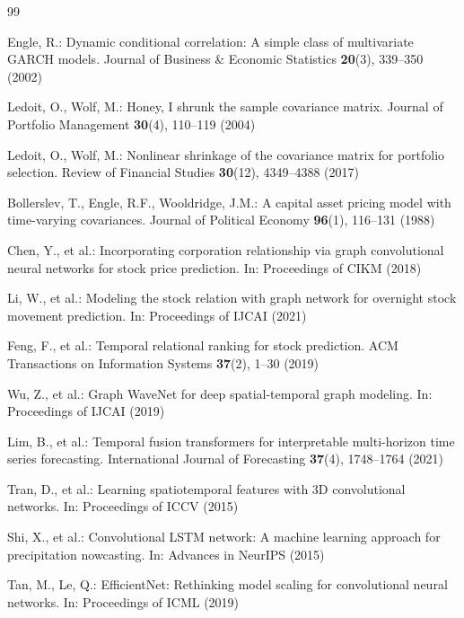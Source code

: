 \documentclass[runningheads]{llncs}
\begin{document}
\begin{thebibliography}{99}

Engle, R.: Dynamic conditional correlation: A simple class of multivariate
GARCH models. Journal of Business \& Economic Statistics \textbf{20}(3),
339--350 (2002)

Ledoit, O., Wolf, M.: Honey, I shrunk the sample covariance matrix.
Journal of Portfolio Management \textbf{30}(4), 110--119 (2004)

Ledoit, O., Wolf, M.: Nonlinear shrinkage of the covariance matrix for
portfolio selection. Review of Financial Studies \textbf{30}(12),
4349--4388 (2017)

Bollerslev, T., Engle, R.F., Wooldridge, J.M.: A capital asset pricing
model with time-varying covariances. Journal of Political Economy
\textbf{96}(1), 116--131 (1988)

Chen, Y., et al.: Incorporating corporation relationship via graph
convolutional neural networks for stock price prediction. In: Proceedings
of CIKM (2018)

Li, W., et al.: Modeling the stock relation with graph network for
overnight stock movement prediction. In: Proceedings of IJCAI (2021)

Feng, F., et al.: Temporal relational ranking for stock prediction.
ACM Transactions on Information Systems \textbf{37}(2), 1--30 (2019)

Wu, Z., et al.: Graph WaveNet for deep spatial-temporal graph modeling.
In: Proceedings of IJCAI (2019)

Lim, B., et al.: Temporal fusion transformers for interpretable
multi-horizon time series forecasting. International Journal of
Forecasting \textbf{37}(4), 1748--1764 (2021)

Tran, D., et al.: Learning spatiotemporal features with 3D convolutional
networks. In: Proceedings of ICCV (2015)

Shi, X., et al.: Convolutional LSTM network: A machine learning approach
for precipitation nowcasting. In: Advances in NeurIPS (2015)

Tan, M., Le, Q.: EfficientNet: Rethinking model scaling for convolutional
neural networks. In: Proceedings of ICML (2019)


\end{thebibliography}
\end{document}

